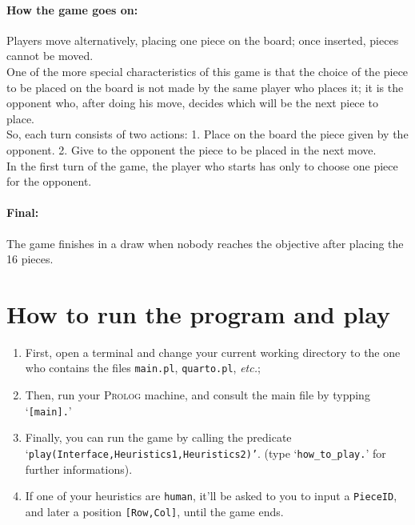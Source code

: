 \documentclass[a4paper,11pt]{article}
\newcommand{\tw}[1]{\texttt{#1}}
\begin{document}
		\paragraph{How the game goes on:} Players move alternatively, placing one piece on the board; once inserted, pieces cannot be moved. \\
		One of the more special characteristics of this game is that the choice of the piece to be placed on the board is not made by the same player who places it; it is the opponent who, after doing his move, decides which will be the next piece to place. \\
		So, each turn consists of two actions: 1. Place on the board the piece given by the opponent. 2. Give to the opponent the piece to be placed in the next move. \\
		In the first turn of the game, the player who starts has only to choose one piece for the opponent.

		\paragraph{Final:} The game finishes in a draw when nobody reaches the objective after placing the 16 pieces.

	\section{How to run the program and play}
		\begin{enumerate}
			\item First, open a terminal and change your current working directory to the one who contains the files \tw{main.pl}, \tw{quarto.pl}, \textit{etc.};
			\item Then, run your \textsc{Prolog} machine, and consult the main file by typping `\tw{[main].}'
			\item Finally, you can run the game by calling the predicate `\tw{play(Interface,Heuristics1,Heuristics2)'}. (type `\tw{how\_to\_play.}' for further informations).
			\item If one of your heuristics are \tw{human}, it'll be asked to you to input a \tw{PieceID}, and later a position \tw{[Row,Col]}, until the game ends.
		\end{enumerate}
\end{document}
